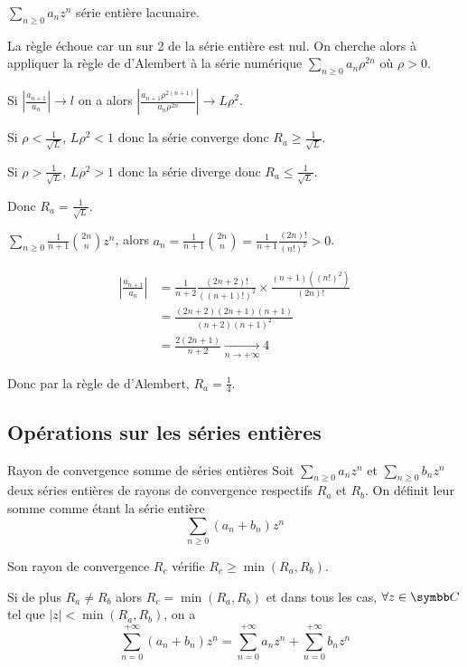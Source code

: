 \begin{exemple}
    $\sum_{n \geqslant 0 } a_n z^n$ série entière lacunaire. 

    La règle échoue car un sur 2 de la série entière est nul. On cherche alors à appliquer la règle 
    de d'Alembert à la série numérique $\sum_{n \geqslant 0} a_n \rho^{2n}$ où $\rho > 0$.

    Si $\left| \frac{a_{n + 1}}{a_n} \right| \to l$ on a alors 
    $\displaystyle \left| \frac{a_{n + 1} \rho^{2(n + 1)}}{a_n \rho^{2n}} \right| \to L \rho^2$. 

    Si $\rho < \frac 1 {\sqrt L}$, $L \rho^2 < 1$ donc la série converge donc $R_a \geqslant \frac 1 {\sqrt L}$.

    Si $\rho > \frac 1 {\sqrt L}$, $L \rho^2 > 1$ donc la série diverge donc $R_a \leqslant \frac 1 {\sqrt L}$.

    Donc $R_a = \frac 1 {\sqrt L}$.
\end{exemple}

\begin{exemple}
    $ \sum_{n \geqslant 0 } \frac 1 {n + 1} \binom{2n }{n } z^n$, alors $a_n = \frac 1 {n + 1} \binom{2n }{ n } = \frac{1 }{n + 1 } \frac{(2n)!}{(n!)^2} > 0$.

    \begin{align}
        \left| \frac{a_{n + 1 }}{a_n } \right| & = \frac 1 {n + 2} \frac{(2n + 2)!}{ ((n + 1)!)^2} \times \frac{(n + 1)((n!)^2)}{(2n)!} \\
        & = \frac{(2n + 2)(2n + 1)(n + 1)}{(n + 2)(n + 1)^2} \\
        & = \frac{2(2n + 1)}{n + 2} \xrightarrow[n \to + \infty ]{} 4
    \end{align}

    Donc par la règle de d'Alembert, $R_a = \frac 1 4$.
\end{exemple}

\subsection{Opérations sur les séries entières }

\begin{proposition}{Rayon de convergence somme de séries entières}{}
    Soit $\sum_{n \geqslant 0} a_n z^n$ et $\sum_{n \geqslant 0} b_n z^n$ deux séries entières 
    de rayons de convergence respectifs $R_a$ et $R_b$. On définit leur somme comme étant la série 
    entière 
    $$\sum_{n \geqslant 0} (a_n + b_n) z^n$$

    Son rayon de convergence $R_c$ vérifie $R_c \geqslant \min(R_a, R_b)$.

    Si de plus $R_a \neq R_b$ alors $R_c = \min(R_a, R_b)$ et dans tous les cas, 
    $\forall z \in \C$ tel que $|z| < \min(R_a, R_b)$, on a
    $$\sum_{n = 0}^{+\infty} (a_n + b_n) z^n = \sum_{n = 0}^{+\infty} a_n z^n + \sum_{n = 0}^{+\infty} b_n z^n$$
\end{proposition}

